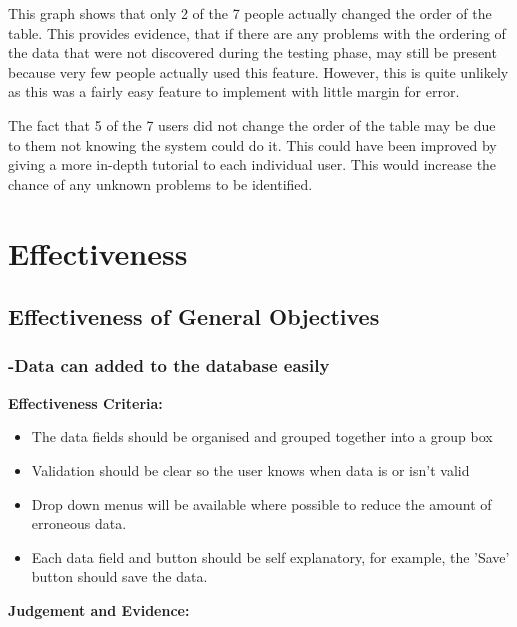 This graph shows that only 2 of the 7 people actually changed the order of the table. This provides evidence, that if there are any problems with the ordering of the data that were not discovered during the testing phase, may still be present because very few people actually used this feature. However, this is quite unlikely as this was a fairly easy feature to implement with little margin for error.

The fact that 5 of the 7 users did not change the order of the table may be due to them not knowing the system could do it. This could have been improved by giving a more in-depth tutorial to each individual user. This would increase the chance of any unknown problems to be identified.

















\pagebreak
\section{Effectiveness}

\subsection{Effectiveness of General Objectives}

\vspace{10mm}

\subsubsection{-Data can added to the database easily}

\textbf{Effectiveness Criteria:}\newline
\begin{itemize}
	\item{The data fields should be organised and grouped together into a group box}
	\item{Validation should be clear so the user knows when data is or isn't valid}
	\item{Drop down menus will be available where possible to reduce the amount of erroneous data.}
	\item{Each data field and button should be self explanatory, for example, the 'Save' button should save the data.}
\end{itemize}
\textbf{Judgement and Evidence:} \newline

